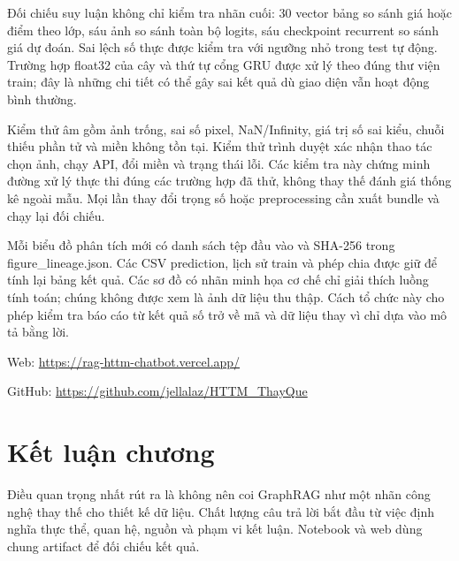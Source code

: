Đối chiếu suy luận không chỉ kiểm tra nhãn cuối: 30 vector bảng so sánh
giá hoặc điểm theo lớp, sáu ảnh so sánh toàn bộ logits, sáu checkpoint
recurrent so sánh giá dự đoán. Sai lệch số thực được kiểm tra với ngưỡng
nhỏ trong test tự động. Trường hợp float32 của cây và thứ tự cổng GRU
được xử lý theo đúng thư viện train; đây là những chi tiết có thể gây
sai kết quả dù giao diện vẫn hoạt động bình thường.

Kiểm thử âm gồm ảnh trống, sai số pixel, NaN/Infinity, giá trị số sai
kiểu, chuỗi thiếu phần tử và miền không tồn tại. Kiểm thử trình duyệt
xác nhận thao tác chọn ảnh, chạy API, đổi miền và trạng thái lỗi. Các
kiểm tra này chứng minh đường xử lý thực thi đúng các trường hợp đã thử,
không thay thế đánh giá thống kê ngoài mẫu. Mọi lần thay đổi trọng số
hoặc preprocessing cần xuất bundle và chạy lại đối chiếu.

Mỗi biểu đồ phân tích mới có danh sách tệp đầu vào và SHA-256 trong
figure\_lineage.json. Các CSV prediction, lịch sử train và phép chia
được giữ để tính lại bảng kết quả. Các sơ đồ có nhãn minh họa cơ chế chỉ
giải thích luồng tính toán; chúng không được xem là ảnh dữ liệu thu
thập. Cách tổ chức này cho phép kiểm tra báo cáo từ kết quả số trở về mã
và dữ liệu thay vì chỉ dựa vào mô tả bằng lời.

Web: \url{https://rag-httm-chatbot.vercel.app/}

GitHub: \url{https://github.com/jellalaz/HTTM_ThayQue}

\section{Kết luận chương}\label{kux1ebft-luux1eadn-chux1b0ux1a1ng-1}

Điều quan trọng nhất rút ra là không nên coi GraphRAG như một nhãn công
nghệ thay thế cho thiết kế dữ liệu. Chất lượng câu trả lời bắt đầu từ
việc định nghĩa thực thể, quan hệ, nguồn và phạm vi kết luận. Notebook
và web dùng chung artifact để đối chiếu kết quả.
